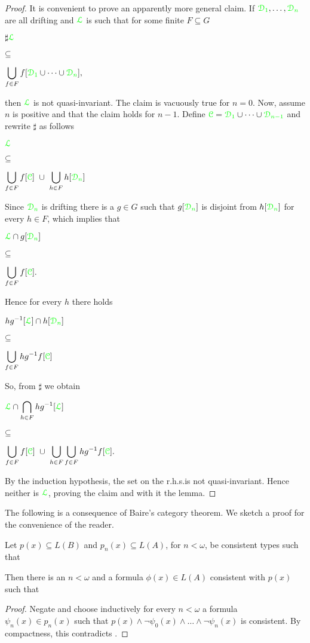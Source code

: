 \documentclass[creche.tex]{subfiles}
\begin{document}
\begin{proof}
\def\medrel#1{\parbox[t]{6ex}{$\displaystyle\hfil #1$}}
\def\ceq#1#2#3{\noindent\parbox[t]{30ex}{$\displaystyle #1$}\medrel{#2}{$\displaystyle #3$}}

It is convenient to prove an apparently more general claim. If ${\color{green}\EuScript D_1},\dots,{\color{green}\EuScript D_n}$ are all drifting and ${\color{green}\EuScript L}$ is such that for some finite $F\subseteq G$\medskip 

\ceq{\sharp\hfill{\gr\Ll}}{\subseteq}{\bigcup_{f\in F}f[{\gr\D_1}\cup\dots\cup{\gr\D_n}],} 

then ${\color{green}\EuScript L}$ is not quasi-invariant. The claim is vacuously true for $n=0$. Now, assume $n$ is positive and that the claim holds for $n-1$. Define ${\color{green}\EuScript C}={\color{green}\EuScript D_1}\cup\dots\cup{\color{green}\EuScript D_{n-1}}$ and rewrite $\sharp$ as follows

\ceq{\hfill{\gr\Ll}}{\subseteq}{\bigcup_{f\in F}f[\grC]\ \cup\ \bigcup_{h\in F}h[{\gr\D_n}]}

Since ${\color{green}\EuScript D_n}$ is drifting there is a $g\in G$ such that $g[{\color{green}\EuScript D_n}]$ is disjoint from $h[{\color{green}\EuScript D_n}]$ for every $h\in F$, which implies that\medskip 

\ceq{\hfill{\gr\Ll}\cap g[{\gr\D_n}]}{\subseteq}{\bigcup_{f\in F}f[\grC].} 

Hence for every $h$ there holds\medskip 

\ceq{\hfill h g^{-1}[{\gr\Ll}]\cap h[{\gr\D_n}]}{\subseteq}{\bigcup_{f\in F}hg^{-1}f[\grC]} 

So, from $\sharp$ we obtain\medskip 

\ceq{\hfill{\gr\Ll}\cap\bigcap_{h\in F}h g^{-1}[{\gr\Ll}]}{\subseteq}{\bigcup_{f\in F}f[\grC]\ \cup\ \bigcup_{h\in F}\bigcup_{f\in F}hg^{-1}f[\grC].}\smallskip


\noindent By the induction hypothesis, the set on the r.h.s.\@ is not quasi-invariant. Hence neither is ${\color{green}\EuScript L}$, proving the claim and with it the lemma.
\end{proof}

The following is a consequence of Baire's category theorem. We sketch a proof for the convenience of the reader.


\begin{lemma}\label{Baire}
Let $p(x)\subseteq L(B)$ and $p_n(x)\subseteq L(A)$, for $n<\omega$, be consistent types such that\smallskip


\noindent Then there is an $n<\omega$ and a formula $\phi(x)\in L(A)$ consistent with $p(x)$ such that \smallskip

\end{lemma}
\begin{proof}
Negate  and choose inductively for every $n<\omega$ a formula $\psi_n(x)\in p_n(x)$ such that $p(x)\wedge\neg\psi_0(x)\wedge\dots\wedge\neg\psi_n(x)$ is consistent. By compactness, this contradicts .
\end{proof}
\end{document}
